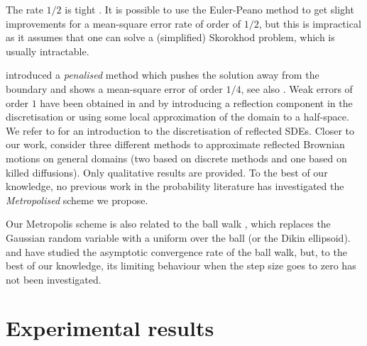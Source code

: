 The rate $1/2$ is tight \parencite{pacchiarotti1998numerical}.
It is possible to use the Euler-Peano method to get slight improvements for a mean-square error rate of order of $1/2$, but this is impractical as it assumes that one can solve a (simplified) Skorokhod problem, which is usually intractable.

\textcite{liu1993numerical} introduced a \emph{penalised}
method which pushes the solution away from the boundary and shows a mean-square error
of order $1/4$, see also \cite{pettersson1997penalization}.
Weak errors of order $1$ have been obtained in \cite{bossy2004symmetrized} and \cite{gobet2001euler} by introducing a reflection component in the discretisation or using some local approximation of the domain to a half-space.
We refer to \cite{pilipenko2014introduction} for an introduction to the discretisation of reflected SDEs.
Closer to our work, \cite{burdzy2008discrete} consider three different methods to approximate reflected Brownian motions on general domains (two based on discrete methods and one based on killed diffusions).
Only qualitative results are provided.
To the best of our knowledge, no previous work in the probability literature has investigated the \emph{Metropolised} scheme we propose.

Our Metropolis scheme is also related to the ball walk \parencite{applegate1991sampling}, which replaces the Gaussian random variable with a uniform over the ball (or the Dikin ellipsoid).
\textcite{applegate1991sampling} and \cite{lovasz2007geometry} have
studied the asymptotic convergence rate of the ball walk, but, to the best of our
knowledge, its limiting behaviour when the step size goes to zero has not been
investigated.

\section{Experimental results}

